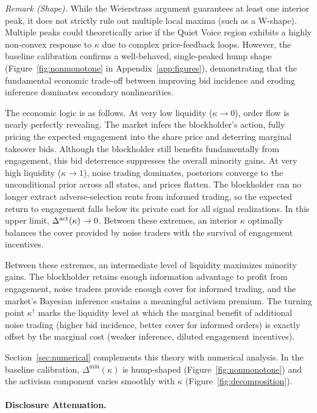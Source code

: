 \documentclass[11pt]{article}
\newcommand{\1}{\mathbf{1}}
\begin{document}
\emph{Remark (Shape).} While the Weierstrass argument guarantees at least one interior peak, it does not strictly rule out multiple local maxima (such as a W-shape). Multiple peaks could theoretically arise if the Quiet Voice region exhibits a highly non-convex response to $\kappa$ due to complex price-feedback loops. However, the baseline calibration confirms a well-behaved, single-peaked hump shape (Figure~\ref{fig:nonmonotone} in Appendix~\ref{app:figures}), demonstrating that the fundamental economic trade-off between improving bid incidence and eroding inference dominates secondary nonlinearities.

The economic logic is as follows. At very low liquidity ($\kappa \to 0$), order flow is nearly perfectly revealing. The market infers the blockholder's action, fully pricing the expected engagement into the share price and deterring marginal takeover bids. Although the blockholder still benefits fundamentally from engagement, this bid deterrence suppresses the overall minority gains. At very high liquidity ($\kappa \to 1$), noise trading dominates, posteriors converge to the unconditional prior across all states, and prices flatten. The blockholder can no longer extract adverse-selection rents from informed trading, so the expected return to engagement falls below its private cost for all signal realizations. In this upper limit, $\Delta^{\textup{act}}(\kappa)\to 0$. Between these extremes, an interior $\kappa$ optimally balances the cover provided by noise traders with the survival of engagement incentives.

Between these extremes, an intermediate level of liquidity maximizes minority gains. The blockholder retains enough information advantage to profit from engagement, noise traders provide enough cover for informed trading, and the market's Bayesian inference sustains a meaningful activism premium. The turning point $\kappa^{\dagger}$ marks the liquidity level at which the marginal benefit of additional noise trading (higher bid incidence, better cover for informed orders) is exactly offset by the marginal cost (weaker inference, diluted engagement incentives).

Section~\ref{sec:numerical} complements this theory with numerical analysis. In the baseline calibration, $\Delta^{\min}(\kappa)$ is hump-shaped (Figure~\ref{fig:nonmonotone}) and the activism component varies smoothly with $\kappa$ (Figure~\ref{fig:decomposition}).

%
\paragraph{Disclosure Attenuation.}
%
\end{document}
